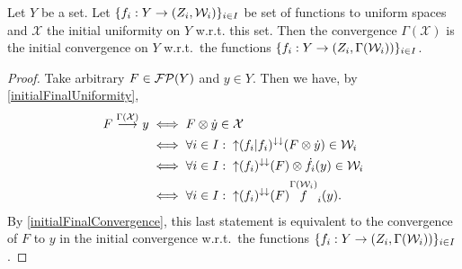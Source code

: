 \begin{proposition} \label{initialUniformConvergenceIsInitialConvergence}
Let $Y$ be a set. Let $\{f_i: Y\to \sSet{Z_i, \mathcal{W}_i}\}_{i\in I}$ be set of functions to uniform spaces and $\mathcal{X}$ the initial uniformity on $Y$ w.r.t. this set. Then the convergence $\Gamma(\mathcal{X})$ is the initial convergence on $Y$ w.r.t.\ the functions $\{f_i: Y\to \sSet{Z_i, \Gamma(\mathcal{W}_i)}\}_{i\in I}$.
\end{proposition}
\begin{proof}
Take arbitrary $F\in\operatorname{\mathcal{FP}}(Y)$ and $y\in Y$. Then we have, by \ref{initialFinalUniformity},
\begin{align*}
F \overset{\Gamma(\mathcal{X})}{\longrightarrow} y &\iff F\otimes \dot{y} \in \mathcal{X} \\
&\iff \forall i\in I:\; \operatorname{\uparrow} (f_i|f_i)^{\downarrow\downarrow}(F\otimes \dot{y}) \in \mathcal{W}_i \\
&\iff \forall i\in I:\; \operatorname{\uparrow} (f_i)^{\downarrow\downarrow}(F)\otimes \dot{f}_i(y) \in \mathcal{W}_i \\
&\iff \forall i\in I:\; \operatorname{\uparrow} (f_i)^{\downarrow\downarrow}(F)\overset{\Gamma(\mathcal{W}_i)} f_i(y).
\end{align*}
By \ref{initialFinalConvergence}, this last statement is equivalent to the convergence of $F$ to $y$ in the initial convergence w.r.t.\ the functions $\{f_i: Y\to \sSet{Z_i, \Gamma(\mathcal{W}_i)}\}_{i\in I}$.
\end{proof}

